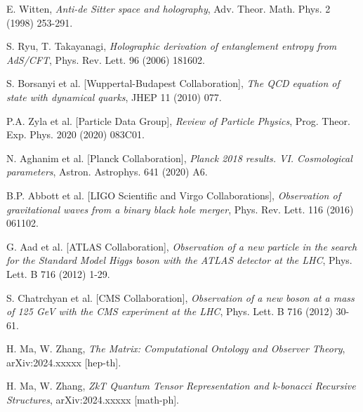 \documentclass[11pt]{article}
\begin{document}
\begin{thebibliography}{99}
 E. Witten, \textit{Anti-de Sitter space and holography}, Adv. Theor. Math. Phys. 2 (1998) 253-291.

 S. Ryu, T. Takayanagi, \textit{Holographic derivation of entanglement entropy from AdS/CFT}, Phys. Rev. Lett. 96 (2006) 181602.

 S. Borsanyi et al. [Wuppertal-Budapest Collaboration], \textit{The QCD equation of state with dynamical quarks}, JHEP 11 (2010) 077.

 P.A. Zyla et al. [Particle Data Group], \textit{Review of Particle Physics}, Prog. Theor. Exp. Phys. 2020 (2020) 083C01.

 N. Aghanim et al. [Planck Collaboration], \textit{Planck 2018 results. VI. Cosmological parameters}, Astron. Astrophys. 641 (2020) A6.

 B.P. Abbott et al. [LIGO Scientific and Virgo Collaborations], \textit{Observation of gravitational waves from a binary black hole merger}, Phys. Rev. Lett. 116 (2016) 061102.

 G. Aad et al. [ATLAS Collaboration], \textit{Observation of a new particle in the search for the Standard Model Higgs boson with the ATLAS detector at the LHC}, Phys. Lett. B 716 (2012) 1-29.

 S. Chatrchyan et al. [CMS Collaboration], \textit{Observation of a new boson at a mass of 125 GeV with the CMS experiment at the LHC}, Phys. Lett. B 716 (2012) 30-61.

 H. Ma, W. Zhang, \textit{The Matrix: Computational Ontology and Observer Theory}, arXiv:2024.xxxxx [hep-th].

 H. Ma, W. Zhang, \textit{ZkT Quantum Tensor Representation and k-bonacci Recursive Structures}, arXiv:2024.xxxxx [math-ph].

\end{thebibliography}
\end{document}

